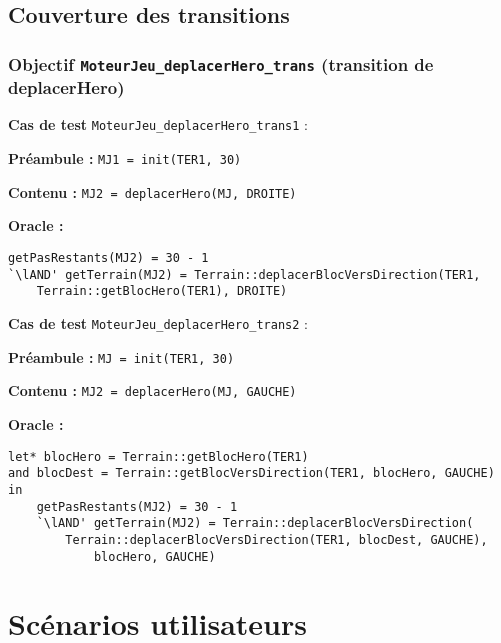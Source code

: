 \documentclass{article}
\newcommand{\cmd}[1]{\texttt{#1}}
\newcommand{\lAND}{$\land$}
\newcommand{\obj}[2]{\subsubsection*{\large{\textbf{Objectif {\cmd{#1} (#2)}}}}}
\newenvironment{cas}[1]
{
	\hspace{1em}\textbf{Cas de test} \cmd{#1} :
	\begin{list}{}{}
}{
	\end{list}\vspace{1em}
}
\newcommand{\pre}[1]{\item \textbf{Préambule :} \cmd{#1}}
\newcommand{\ope}[1]{\item \textbf{Contenu :} \cmd{#1}}
\newcommand{\oram}{\item \textbf{Oracle :}}
\begin{document}
\subsection{Couverture des transitions}

\obj{MoteurJeu\_deplacerHero\_trans} {transition de deplacerHero}
	\begin{cas} {MoteurJeu\_deplacerHero\_trans1}
		\pre{MJ1 = init(TER1, 30)}
		\ope{MJ2 = deplacerHero(MJ, DROITE)}
		\oram{}
		\begin{lstlisting}
getPasRestants(MJ2) = 30 - 1
`\lAND' getTerrain(MJ2) = Terrain::deplacerBlocVersDirection(TER1,
	Terrain::getBlocHero(TER1), DROITE)
		\end{lstlisting}
	\end{cas}

	\begin{cas} {MoteurJeu\_deplacerHero\_trans2}
		\pre{MJ = init(TER1, 30)}
		\ope{MJ2 = deplacerHero(MJ, GAUCHE)}
		\oram{}
		\begin{lstlisting}
let* blocHero = Terrain::getBlocHero(TER1)
and blocDest = Terrain::getBlocVersDirection(TER1, blocHero, GAUCHE)
in
	getPasRestants(MJ2) = 30 - 1
	`\lAND' getTerrain(MJ2) = Terrain::deplacerBlocVersDirection(
		Terrain::deplacerBlocVersDirection(TER1, blocDest, GAUCHE),
			blocHero, GAUCHE)
		\end{lstlisting}
	\end{cas}

\clearpage{}




































\section{Scénarios utilisateurs}
\end{document}
